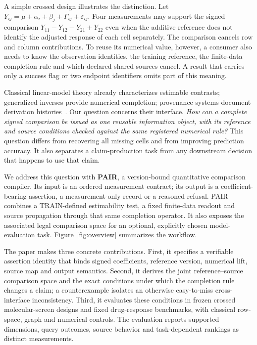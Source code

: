\documentclass[preprint,11pt,times,number,sort&compress]{elsarticle}
\begin{document}
A simple crossed design illustrates the distinction. Let $Y_{ij}=\mu+\alpha_i+\beta_j+\Gamma_{ij}+\varepsilon_{ij}$. Four measurements may support the signed comparison $Y_{11}-Y_{12}-Y_{21}+Y_{22}$ even when the additive reference does not identify the adjusted response of each cell separately. The comparison cancels row and column contributions. To reuse its numerical value, however, a consumer also needs to know the observation identities, the training reference, the finite-data completion rule and which declared shared sources cancel. A result that carries only a success flag or two endpoint identifiers omits part of this meaning.

Classical linear-model theory already characterizes estimable contrasts; generalized inverses provide numerical completion; provenance systems document derivation histories~\cite{searle1971linear,rao1971generalized,freeman1975incomplete,green2007provenance,w3c2013prov}. Our question concerns their interface. \emph{How can a complete signed comparison be issued as one reusable information object, with its reference and source conditions checked against the same registered numerical rule?} This question differs from recovering all missing cells and from improving prediction accuracy. It also separates a claim-production task from any downstream decision that happens to use that claim.

We address this question with \textbf{PAIR}, a version-bound quantitative comparison compiler. Its input is an ordered measurement contract; its output is a coefficient-bearing assertion, a measurement-only record or a reasoned refusal. PAIR combines a TRAIN-defined estimability test, a fixed finite-data readout and source propagation through that same completion operator. It also exposes the associated legal comparison space for an optional, explicitly chosen model-evaluation task. Figure~\ref{fig:overview} summarizes the workflow.

The paper makes three concrete contributions. First, it specifies a verifiable assertion identity that binds signed coefficients, reference version, numerical lift, source map and output semantics. Second, it derives the joint reference--source comparison space and the exact conditions under which the completion rule changes a claim; a counterexample isolates an otherwise easy-to-miss cross-interface inconsistency. Third, it evaluates these conditions in frozen crossed molecular-screen designs and fixed drug-response benchmarks, with classical row-space, graph and numerical controls. The evaluation reports supported dimensions, query outcomes, source behavior and task-dependent rankings as distinct measurements.
\end{document}
